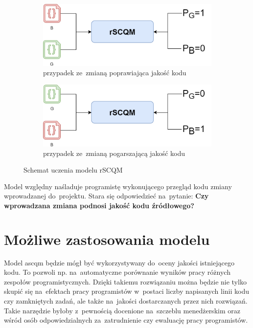 \documentclass[twoside]{praca}
\begin{document}
\begin{figure}[h!]
\centering
\begin{subfigure}{.5\textwidth}
  \includegraphics[width=.98\linewidth]{proj/rscqm-bg.png}
  \caption{przypadek ze~zmianą poprawiająca jakość kodu}
\end{subfigure}%
\begin{subfigure}{.5\textwidth}
  \includegraphics[width=.98\linewidth]{proj/rscqm-gb.png}
  \caption{przypadek ze~zmianą pogarszającą jakość kodu}
\end{subfigure}
\caption{Schemat uczenia modelu rSCQM}
\label{fig:proj:rscqm-l}
\end{figure}

Model względny naśladuje programistę wykonującego przegląd kodu zmiany wprowadzanej do~projektu. Stara się odpowiedzieć na~pytanie: \textbf{Czy wprowadzana zmiana podnosi jakość kodu źródłowego?}

\section{Możliwe zastosowania modelu}


Model \gls{ascqm} będzie mógł być wykorzystywany do~oceny jakości istniejącego kodu. To pozwoli np. na~automatyczne porównanie wyników pracy różnych zespołów programistycznych. Dzięki takiemu rozwiązaniu można będzie nie tylko skupić się na~efektach pracy programistów w~postaci liczby napisanych linii kodu czy zamkniętych zadań, ale także na~jakości dostarczanych przez nich rozwiązań. Takie narzędzie byłoby z~pewnością docenione na~szczeblu menedżerskim oraz wśród osób odpowiedzialnych za~zatrudnienie czy ewaluację pracy programistów.
\end{document}
